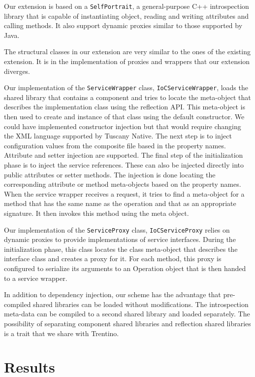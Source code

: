Our extension is based on a \texttt{SelfPortrait}, a general-purpose C++ introspection library that is capable
of instantiating object, reading and writing attributes and calling methods. It also support dynamic proxies
similar to those supported by Java.

The structural classes in our extension are very similar to the ones of the existing extension. It is in the
implementation of proxies and wrappers that our extension diverges.

Our implementation of the \texttt{ServiceWrapper} class, \texttt{IoCServiceWrapper}, loads the shared library
that contains a component and tries to locate the meta-object that describes the implementation class using
the reflection API. This meta-object is then used to create and instance of that class using the default constructor.
We could have implemented constructor injection but that would require changing the XML language supported by
Tuscany Native. The next step is to inject configuration values from the composite file based in the property names.
Attribute and setter injection are supported. The final step of the initialization phase is to inject the service
references. These can also be injected directly into public attributes or setter methods. The injection is done
locating the corresponding attribute or method meta-objects based on the property names. When the service wrapper
receives a request, it tries to find a meta-object for a method that has the same name as the operation and that
as an appropriate signature. It then invokes this method using the meta object.

Our implementation of the \texttt{ServiceProxy} class, \texttt{IoCServiceProxy} relies on dynamic proxies to provide
implementations of service interfaces. During the initialization phase, this class locates the class meta-object that
describes the interface class and creates a proxy for it. For each method, this proxy is configured to serialize its
arguments to an Operation object that is then handed to a service wrapper.

In addition to dependency injection, our scheme has the advantage that pre-compiled shared libraries can be loaded without
modifications. The introspection meta-data can be compiled to a second shared library and loaded separately.
The possibility of separating component shared libraries and reflection shared libraries is a trait that we share with Trentino.

\section{Results}

